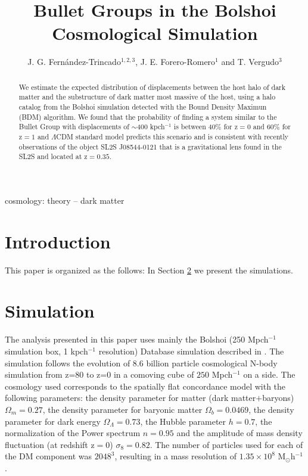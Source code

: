 \documentclass[12pt,preprint]{aastex}
\begin{document}
 

\title{Bullet Groups in the Bolshoi Cosmological Simulation}
\author{J. G. Fern\'andez-Trincado$^{1,2,3}$, J. E. Forero-Romero$^1$ and T. Vergudo$^3$}
       
\begin{abstract}

We estimate the expected distribution of displacements between the host halo of dark matter and the 
substructure of dark matter most massive of the host, using a halo catalog from the Bolshoi simulation detected 
with the Bound Density Maximun (BDM) algorithm. We found that the probability of finding a system similar to the Bullet
Group with displacements of $\sim$400 kpch$^{-1}$ is between 40\% for z$=0$ and 60\% for z$=1$ and $\Lambda$CDM standard 
model predicts this scenario and is consistent with recently observations of the object SL2S J08544-0121 that is 
a gravitational lens found in the SL2S and located at z$=0.35$. 

\end{abstract}

\begin{keywords}
{cosmology: theory -- dark matter} 
\end{keywords}

\section{Introduction}


This paper is organized as the follows: In Section
\ref{simulation} we present the simulations.

\section{Simulation}
\label{simulation}

The analysis presented in this paper uses mainly the Bolshoi (250 Mpch$^{-1}$ simulation box, 1 kpch$^{-1}$ resolution) Database simulation described in
\citet{2011ApJ...740..102K}. The simulation follows the evolution of 8.6 billion particle cosmological N-body simulation
from z=80 to z=0 in a comoving cube of $250$ Mpch$^{-1}$
on a side. The cosmology used  corresponds to  the spatially flat
concordance model with the
following parameters:  the density parameter for matter (dark matter$+$baryons) $\Omega_m=0.27$, the density parameter for baryonic matter
 $\Omega_b=0.0469$, the density parameter for dark energy $\Omega_{\Lambda}=0.73$, the Hubble
parameter $h=0.7$, the normalization of the Power spectrum $n=0.95$ and
the amplitude of mass density fluctuation (at redshift z$=$0) $\sigma_8=0.82$.  The number of particles used for each of
the DM component was $2048^3$, resulting in a mass resolution of $1.35 \times
10^8$ M$_{\odot}$h$^{-1}$.   
\end{document}
